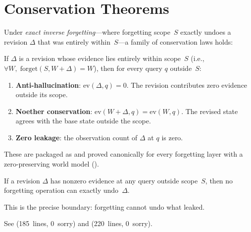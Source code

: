 \documentclass[11pt,openany]{report}
\begin{document}

\section{Conservation Theorems}

Under \emph{exact inverse forgetting}---where forgetting scope~$S$
exactly undoes a revision $\Delta$ that was entirely within~$S$---a
family of conservation laws holds:

\begin{theorem}
\label{thm:conservation}
If $\Delta$ is a revision whose evidence lies entirely within scope~$S$
(i.e., $\forall W,\; \mathrm{forget}(S, W + \Delta) = W$), then for
every query $q$ outside~$S$:
\begin{enumerate}
\item \textbf{Anti-hallucination}: $\mathrm{ev}(\Delta, q) = 0$.
  The revision contributes zero evidence outside its scope.
\item \textbf{Noether conservation}: $\mathrm{ev}(W + \Delta, q) =
  \mathrm{ev}(W, q)$.  The revised state agrees with the base state
  outside the scope.
\item \textbf{Zero leakage}: the observation count of $\Delta$ at $q$
  is zero.
\end{enumerate}
\end{theorem}

\noindent
These are packaged as  and proved
canonically for every forgetting layer with a zero-preserving world
model ().

\begin{theorem}
If a revision $\Delta$ has nonzero evidence at any query outside
scope~$S$, then no forgetting operation can exactly undo~$\Delta$.
\end{theorem}

\noindent
This is the precise boundary: forgetting cannot undo what leaked.

See 
(185~lines, 0~sorry) and
(220~lines, 0~sorry).
\end{document}

